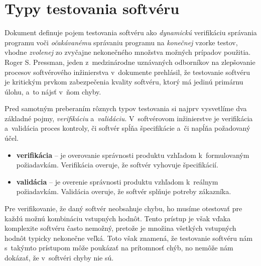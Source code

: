 \section{Typy testovania softvéru} 
\label{sekcia:typy_testovania}
Dokument \cite{Swebok} definuje pojem testovania softvéru ako 
\emph{dynamickú} verifikáciu správania programu voči \emph{očakávanému} 
správaniu programu na \emph{konečnej} vzorke testov, vhodne \emph{zvolenej} 
zo zvyčajne nekonečného množstva možných prípadov použitia.
Roger S. Pressman, jeden z~medzinárodne uznávaných odborníkov na 
zlepšovanie procesov softvérového inžinierstva v~dokumente 
\cite{Pressman} prehlásil, že testovanie softvéru je kritickým prvkom 
zabezpečenia kvality softvéru, ktorý má jedinú primárnu úlohu, 
a~to nájsť v~ňom chyby.  

Pred samotným preberaním rôznych typov testovania si najprv vysvetlíme
dva základné pojmy, \emph{verifikáciu} a~\emph{validáciu}. 
V~softvérovom inžinierstve je verifikácia a~validácia proces kontroly, či
softvér spĺňa špecifikácie a~či napĺňa požadovaný účel.
\begin{itemize}
\item \textbf{verifikácia} -- je overovanie správnosti produktu vzhľadom
k~formulovaným požiadavkám. Verifikácia overuje, že softvér vyhovuje 
špecifikácií.
\item \textbf{validácia} -- je overenie správnosti produktu vzhľadom
k~reálnym požiadavkám. Validácia overuje, že softvér splňuje potreby
zákazníka.
\end{itemize}

Pre verifikovanie, že daný softvér neobsahuje chybu, ho musíme otestovať
pre každú možnú kombináciu vstupných hodnôt. Tento prístup je však vďaka 
komplexite softvéru často nemožný, pretože je množina všetkých vstupných
hodnôt typicky nekonečne veľká. 
Toto však znamená, že testovanie softvéru nám s~takýmto 
prístupom môže poukázať na prítomnosť chýb, no nemôže nám dokázať, 
že v~softvéri chyby nie sú.

